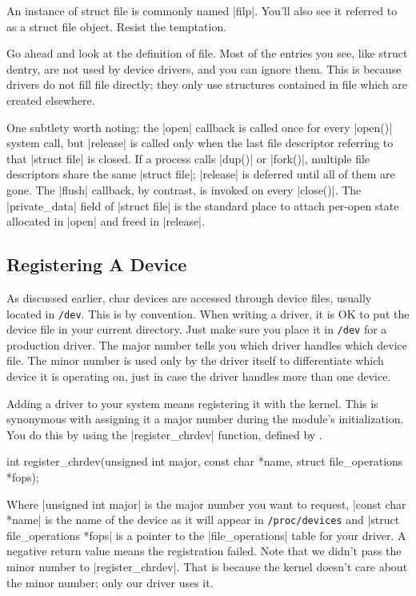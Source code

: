 \documentclass[10pt, oneside]{book}
\begin{document}
An instance of struct file is commonly named \cpp|filp|.
You'll also see it referred to as a struct file object.
Resist the temptation.

Go ahead and look at the definition of file.
Most of the entries you see, like struct dentry, are not used by device drivers, and you can ignore them.
This is because drivers do not fill file directly; they only use structures contained in file which are created elsewhere.

One subtlety worth noting: the \cpp|open| callback is called once for every \cpp|open()| system call,
but \cpp|release| is called only when the last file descriptor referring to that \cpp|struct file| is closed.
If a process calls \cpp|dup()| or \cpp|fork()|, multiple file descriptors share the same \cpp|struct file|;
\cpp|release| is deferred until all of them are gone.
The \cpp|flush| callback, by contrast, is invoked on every \cpp|close()|.
The \cpp|private_data| field of \cpp|struct file| is the standard place to attach per-open state allocated in \cpp|open| and freed in \cpp|release|.

\subsection{Registering A Device}
\label{sec:register_device}
As discussed earlier, char devices are accessed through device files, usually located in \verb|/dev|.
This is by convention. When writing a driver, it is OK to put the device file in your current directory.
Just make sure you place it in \verb|/dev| for a production driver.
The major number tells you which driver handles which device file.
The minor number is used only by the driver itself to differentiate which device it is operating on, just in case the driver handles more than one device.

Adding a driver to your system means registering it with the kernel.
This is synonymous with assigning it a major number during the module's initialization.
You do this by using the \cpp|register_chrdev| function, defined by .

\begin{code}
int register_chrdev(unsigned int major, const char *name, struct file_operations *fops);
\end{code}

Where \cpp|unsigned int major| is the major number you want to request, \cpp|const char *name| is the name of the device as it will appear in \verb|/proc/devices| and \cpp|struct file_operations *fops| is a pointer to the \cpp|file_operations| table for your driver.
A negative return value means the registration failed. Note that we didn't pass the minor number to \cpp|register_chrdev|.
That is because the kernel doesn't care about the minor number; only our driver uses it.
\end{document}
